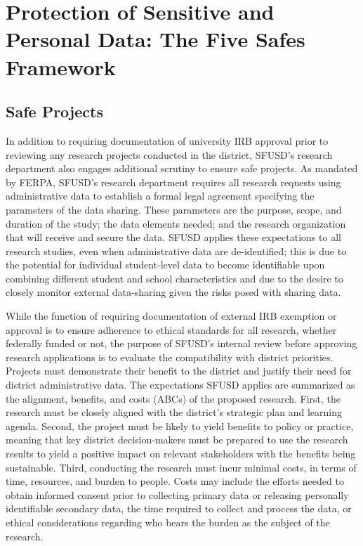 \hypertarget{protection-of-sensitive-and-personal-data-the-five-safes-framework-4}{%
\section{Protection of Sensitive and Personal Data: The Five Safes Framework}\label{protection-of-sensitive-and-personal-data-the-five-safes-framework-4}}

\hypertarget{safe-projects-4}{%
\subsection{Safe Projects}\label{safe-projects-4}}

In addition to requiring documentation of university IRB approval prior to reviewing any research projects conducted in the district, SFUSD's research department also engages additional scrutiny to ensure safe projects. As mandated by FERPA, SFUSD's research department requires all research requests using administrative data to establish a formal legal agreement specifying the parameters of the data sharing. These parameters are the purpose, scope, and duration of the study; the data elements needed; and the research organization that will receive and secure the data. SFUSD applies these expectations to all research studies, even when administrative data are de-identified; this is due to the potential for individual student-level data to become identifiable upon combining different student and school characteristics and due to the desire to closely monitor external data-sharing given the risks posed with sharing data.

While the function of requiring documentation of external IRB exemption or approval is to ensure adherence to ethical standards for all research, whether federally funded or not, the purpose of SFUSD's internal review before approving research applications is to evaluate the compatibility with district priorities. Projects must demonstrate their benefit to the district and justify their need for district administrative data. The expectations SFUSD applies are summarized as the alignment, benefits, and costs (ABCs) of the proposed research. First, the research must be closely aligned with the district's strategic plan and learning agenda. Second, the project must be likely to yield benefits to policy or practice, meaning that key district decision-makers must be prepared to use the research results to yield a positive impact on relevant stakeholders with the benefits being sustainable. Third, conducting the research must incur minimal costs, in terms of time, resources, and burden to people. Costs may include the efforts needed to obtain informed consent prior to collecting primary data or releasing personally identifiable secondary data, the time required to collect and process the data, or ethical considerations regarding who bears the burden as the subject of the research.

